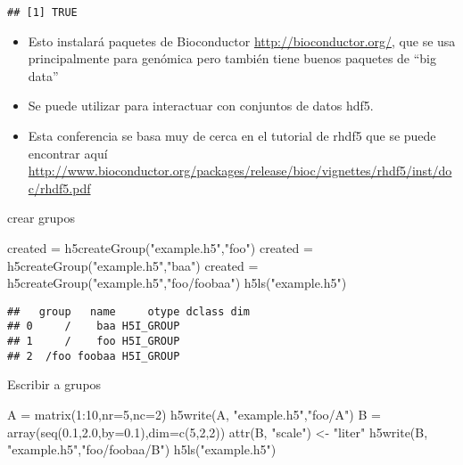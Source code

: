 \documentclass[
]{article}
\newenvironment{Shaded}{\begin{snugshade}}{\end{snugshade}}
\newcommand{\AttributeTok}[1]{\textcolor[rgb]{0.77,0.63,0.00}{#1}}
\newcommand{\DecValTok}[1]{\textcolor[rgb]{0.00,0.00,0.81}{#1}}
\newcommand{\FloatTok}[1]{\textcolor[rgb]{0.00,0.00,0.81}{#1}}
\newcommand{\FunctionTok}[1]{\textcolor[rgb]{0.00,0.00,0.00}{#1}}
\newcommand{\NormalTok}[1]{#1}
\newcommand{\OtherTok}[1]{\textcolor[rgb]{0.56,0.35,0.01}{#1}}
\newcommand{\SpecialCharTok}[1]{\textcolor[rgb]{0.00,0.00,0.00}{#1}}
\newcommand{\StringTok}[1]{\textcolor[rgb]{0.31,0.60,0.02}{#1}}
\providecommand{\tightlist}{%
  \setlength{\itemsep}{0pt}\setlength{\parskip}{0pt}}
\begin{document}
\begin{verbatim}
## [1] TRUE
\end{verbatim}

\begin{itemize}
\tightlist
\item
  Esto instalará paquetes de Bioconductor
  \url{http://bioconductor.org/}, que se usa principalmente para
  genómica pero también tiene buenos paquetes de ``big data''
\item
  Se puede utilizar para interactuar con conjuntos de datos hdf5.
\item
  Esta conferencia se basa muy de cerca en el tutorial de rhdf5 que se
  puede encontrar aquí
  \href{http://www.bioconductor.org/packages/release/bioc/\%20viñetas\%20/\%20rhdf5\%20/\%20inst\%20/\%20doc\%20/\%20rhdf5.pdf}{http://www.bioconductor.org/packages/release/bioc/vignettes/rhdf5/inst/doc/rhdf5.pdf}
\end{itemize}

crear grupos

\begin{Shaded}
\begin{Highlighting}[]
\NormalTok{created }\OtherTok{=} \FunctionTok{h5createGroup}\NormalTok{(}\StringTok{"example.h5"}\NormalTok{,}\StringTok{"foo"}\NormalTok{)}
\NormalTok{created }\OtherTok{=} \FunctionTok{h5createGroup}\NormalTok{(}\StringTok{"example.h5"}\NormalTok{,}\StringTok{"baa"}\NormalTok{)}
\NormalTok{created }\OtherTok{=} \FunctionTok{h5createGroup}\NormalTok{(}\StringTok{"example.h5"}\NormalTok{,}\StringTok{"foo/foobaa"}\NormalTok{)}
\FunctionTok{h5ls}\NormalTok{(}\StringTok{"example.h5"}\NormalTok{)}
\end{Highlighting}
\end{Shaded}

\begin{verbatim}
##   group   name     otype dclass dim
## 0     /    baa H5I_GROUP           
## 1     /    foo H5I_GROUP           
## 2  /foo foobaa H5I_GROUP
\end{verbatim}

Escribir a grupos

\begin{Shaded}
\begin{Highlighting}[]
\NormalTok{A }\OtherTok{=} \FunctionTok{matrix}\NormalTok{(}\DecValTok{1}\SpecialCharTok{:}\DecValTok{10}\NormalTok{,}\AttributeTok{nr=}\DecValTok{5}\NormalTok{,}\AttributeTok{nc=}\DecValTok{2}\NormalTok{)}
\FunctionTok{h5write}\NormalTok{(A, }\StringTok{"example.h5"}\NormalTok{,}\StringTok{"foo/A"}\NormalTok{)}
\NormalTok{B }\OtherTok{=} \FunctionTok{array}\NormalTok{(}\FunctionTok{seq}\NormalTok{(}\FloatTok{0.1}\NormalTok{,}\FloatTok{2.0}\NormalTok{,}\AttributeTok{by=}\FloatTok{0.1}\NormalTok{),}\AttributeTok{dim=}\FunctionTok{c}\NormalTok{(}\DecValTok{5}\NormalTok{,}\DecValTok{2}\NormalTok{,}\DecValTok{2}\NormalTok{))}
\FunctionTok{attr}\NormalTok{(B, }\StringTok{"scale"}\NormalTok{) }\OtherTok{\textless{}{-}} \StringTok{"liter"}
\FunctionTok{h5write}\NormalTok{(B, }\StringTok{"example.h5"}\NormalTok{,}\StringTok{"foo/foobaa/B"}\NormalTok{)}
\FunctionTok{h5ls}\NormalTok{(}\StringTok{"example.h5"}\NormalTok{)}
\end{Highlighting}
\end{Shaded}
\end{document}
